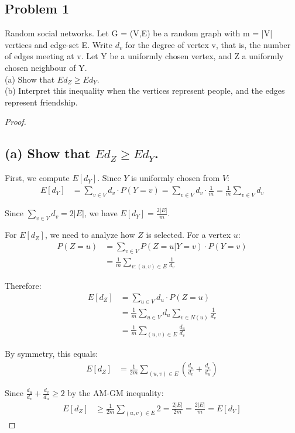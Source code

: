 \documentclass[letterpaper, 11pt]{article}
\newcommand{\1}{\mathds{1}}	%
\theoremstyle{definition}
\begin{document}
\subsection*{Problem 1}
Random social networks. Let G = (V,E) be a random graph with m = |V| vertices and edge-set E. Write $d_v$ for the degree of vertex v, that is, the number of edges meeting at v. Let Y be a uniformly chosen vertex, and Z a uniformly chosen neighbour of Y.
\\(a) Show that $Ed_Z \geq Ed_Y$.
\\(b) Interpret this inequality when the vertices represent people, and the edges represent friendship.
\begin{proof}
    \subsection*{(a) Show that $Ed_Z \geq Ed_Y$.}

First, we compute $E[d_Y]$. Since $Y$ is uniformly chosen from $V$:
\begin{align*}
E[d_Y] &= \sum_{v \in V} d_v \cdot P(Y = v) = \sum_{v \in V} d_v \cdot \frac{1}{m} = \frac{1}{m} \sum_{v \in V} d_v
\end{align*}

Since $\sum_{v \in V} d_v = 2|E|$, we have $E[d_Y] = \frac{2|E|}{m}$.

For $E[d_Z]$, we need to analyze how $Z$ is selected. For a vertex $u$:
\begin{align*}
P(Z = u) &= \sum_{v \in V} P(Z = u | Y = v) \cdot P(Y = v) \\
&= \frac{1}{m} \sum_{v: (u,v) \in E} \frac{1}{d_v}
\end{align*}

Therefore:
\begin{align*}
E[d_Z] &= \sum_{u \in V} d_u \cdot P(Z = u) \\
&= \frac{1}{m} \sum_{u \in V} d_u \sum_{v \in N(u)} \frac{1}{d_v} \\
&= \frac{1}{m} \sum_{(u,v) \in E} \frac{d_u}{d_v}
\end{align*}

By symmetry, this equals:
\begin{align*}
E[d_Z] &= \frac{1}{2m} \sum_{(u,v) \in E} \left(\frac{d_u}{d_v} + \frac{d_v}{d_u}\right)
\end{align*}

Since $\frac{d_u}{d_v} + \frac{d_v}{d_u} \geq 2$ by the AM-GM inequality:
\begin{align*}
E[d_Z] &\geq \frac{1}{2m} \sum_{(u,v) \in E} 2 = \frac{2|E|}{2m} = \frac{2|E|}{m} = E[d_Y]
\end{align*}


\end{proof}
\end{document}
